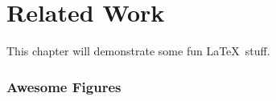 


\chapter{Related Work}
\label{sec:examples}
This chapter will demonstrate some fun \LaTeX\ stuff.

\subsection[Awesome Figures in the TOC]{Awesome Figures} %

